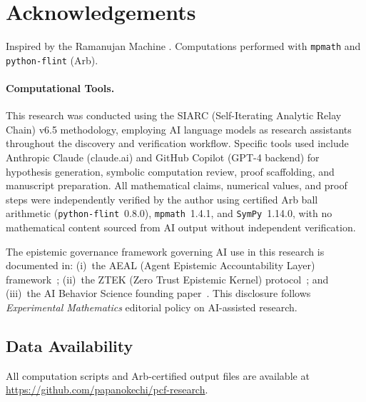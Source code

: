 \documentclass[11pt,a4paper]{article}
\theoremstyle{plain}
\theoremstyle{definition}
\theoremstyle{remark}
\begin{document}
\section*{Acknowledgements}

Inspired by the Ramanujan Machine \citep{raayoni2021,elimelech2024}.
Computations performed with \texttt{mpmath} and \texttt{python-flint} (Arb).

\paragraph{Computational Tools.}
This research was conducted using the SIARC
(Self-Iterating Analytic Relay Chain) v6.5 methodology, employing
AI language models as research assistants throughout the discovery
and verification workflow.
Specific tools used include Anthropic Claude (claude.ai) and GitHub
Copilot (GPT-4 backend) for hypothesis generation, symbolic computation
review, proof scaffolding, and manuscript preparation.
All mathematical claims, numerical values, and proof steps were
independently verified by the author using certified Arb ball arithmetic
(\texttt{python-flint}~0.8.0), \texttt{mpmath}~1.4.1, and
\texttt{SymPy}~1.14.0, with no mathematical content sourced from AI
output without independent verification.

The epistemic governance framework governing AI use in this research is
documented in:
(i)~the AEAL (Agent Epistemic Accountability Layer)
framework~\citep{papanokechi2026aeal};
(ii)~the ZTEK (Zero Trust Epistemic Kernel)
protocol~\citep{papanokechi2026ztek}; and
(iii)~the AI Behavior Science founding
paper~\citep{papanokechi2026aibs}.
This disclosure follows \textit{Experimental Mathematics} editorial
policy on AI-assisted research.

\subsection*{Data Availability}

All computation scripts and Arb-certified output files are available at
\url{https://github.com/papanokechi/pcf-research}.
\end{document}
